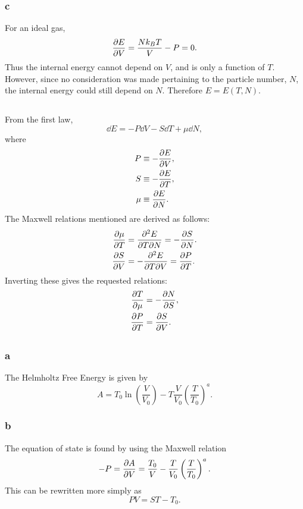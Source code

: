 \documentclass[a4paper,12pt,twoside]{article}
\begin{document}
\begin{multicols*}{2}
\subsubsection*{c}
For an ideal gas,
\begin{equation}
	\pdv{E}{V} = \frac{Nk_BT}{V} - P = 0.
\end{equation}
Thus the internal energy cannot depend on $V$, and is only a function of $T$.
However, since no consideration was made pertaining to the particle number, $N$, the internal energy could still depend on $N$.
Therefore $E = E(T,N)$.
\subsection{}%
From the first law,
\begin{equation}
	\dd{E} = -P\dd{V} - S\dd{T} + \mu \dd{N},
\end{equation}
where
\begin{align}
	P   &\equiv -\pdv{E}{V},\\
	S   &\equiv -\pdv{E}{T},\\
	\mu &\equiv  \pdv{E}{N}.
\end{align}
The Maxwell relations mentioned are derived as follows:
\begin{align}
	\pdv{\mu}{T} &= \pdv{E}{T}{N} = -\pdv{S}{N}.\\
	\pdv{S}{V} &= -\pdv{E}{T}{V} = \pdv{P}{T}.
\end{align}
Inverting these gives the requested relations:
\begin{align}
	\pdv{T}{\mu} &= -\pdv{N}{S},\\
	\pdv{P}{T} &=\pdv{S}{V}.
\end{align}
\subsection{}%
\subsubsection*{a}
The Helmholtz Free Energy is given by
\begin{equation}
	A = T_0 \ln(\frac{V}{V_0}) - T \frac{V}{V_0}\left( \frac{T}{T_0} \right)^a.
\end{equation}
\subsubsection*{b}
The equation of state is found by using the Maxwell relation
\begin{equation}
	-P = \pdv{A}{V} = \frac{T_0}{V} - \frac{T}{V_0}\left( \frac{T}{T_0} \right)^a.
\end{equation}
This can be rewritten more simply as
\begin{equation}
	PV = ST-T_0.
	\label{eq: 4b_answer}
\end{equation}


\end{multicols*}
\end{document}
